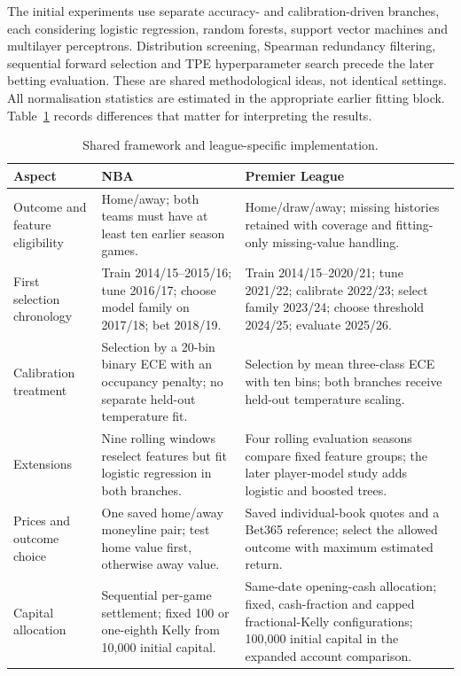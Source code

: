 The initial experiments use separate accuracy- and calibration-driven
branches, each considering logistic regression, random forests, support vector
machines and multilayer perceptrons. Distribution screening, Spearman
redundancy filtering, sequential forward selection and TPE hyperparameter
search precede the later betting evaluation. These are shared methodological
ideas, not identical settings. All normalisation statistics are estimated in
the appropriate earlier fitting block. Table~\ref{tab:league_method_differences}
records differences that matter for interpreting the results.

\begin{table}[htbp]
\centering
\small
\caption{Shared framework and league-specific implementation.}
\label{tab:league_method_differences}
\begin{tabular}{>{\raggedright\arraybackslash}p{}>{\raggedright\arraybackslash}p{}>{\raggedright\arraybackslash}p{}}
\toprule
Aspect & NBA & Premier League \\
\midrule
Outcome and feature eligibility & Home/away; both teams must have at least
ten earlier season games. & Home/draw/away; missing histories retained with
coverage and fitting-only missing-value handling. \\
First selection chronology & Train 2014/15--2015/16; tune 2016/17; choose
model family on 2017/18; bet 2018/19. & Train 2014/15--2020/21; tune 2021/22;
calibrate 2022/23; select family 2023/24; choose threshold 2024/25; evaluate
2025/26. \\
Calibration treatment & Selection by a 20-bin binary ECE with an occupancy
penalty; no separate held-out temperature fit. & Selection by mean three-class
ECE with ten bins; both branches receive held-out temperature scaling. \\
Extensions & Nine rolling windows reselect features but fit logistic
regression in both branches. & Four rolling evaluation seasons compare fixed
feature groups; the later player-model study adds logistic and boosted trees. \\
Prices and outcome choice & One saved home/away moneyline pair; test home
value first, otherwise away value. & Saved individual-book quotes and a
Bet365 reference; select the allowed outcome with maximum estimated return. \\
Capital allocation & Sequential per-game settlement; fixed 100 or one-eighth
Kelly from 10,000 initial capital. & Same-date opening-cash allocation;
fixed, cash-fraction and capped fractional-Kelly configurations; 100,000
initial capital in the expanded account comparison. \\
\bottomrule
\end{tabular}
\end{table}

